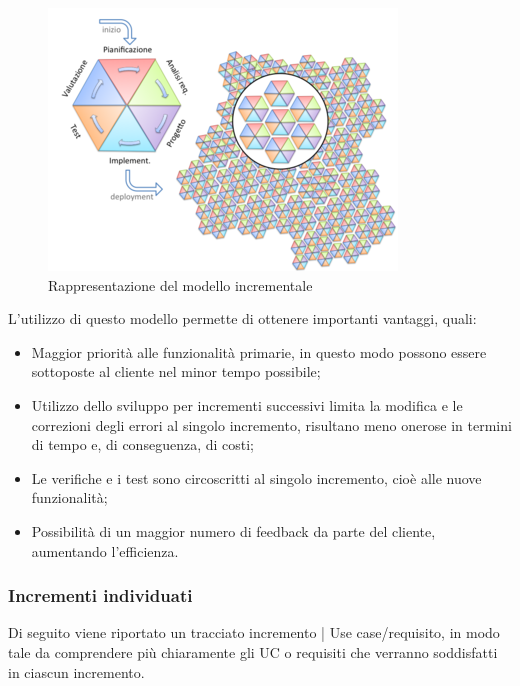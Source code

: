 \documentclass[../piano_di_progetto.tex]{subfiles}
\begin{document}
\begin{figure}[H]
    \centering
    \includegraphics[scale = 0.6]{src/img/modello_incrementale.png}
    \caption{Rappresentazione del modello incrementale}
    \label{fig:logo}
\end{figure}

L'utilizzo di questo modello permette di ottenere importanti vantaggi, quali:
\begin{itemize}
    \item Maggior priorità alle funzionalità primarie, in questo modo possono essere sottoposte al cliente nel minor tempo possibile;
    \item Utilizzo dello sviluppo per incrementi successivi limita la modifica e le correzioni degli errori al singolo incremento, risultano meno onerose in termini di tempo e, di conseguenza, di costi;
    \item Le verifiche e i test sono circoscritti al singolo incremento, cioè alle nuove funzionalità;
    \item Possibilità di un maggior numero di feedback da parte del cliente, aumentando l'efficienza.
\end{itemize}

\subsubsection{Incrementi individuati}
\label{ssub:incr_ind}

Di seguito viene riportato un tracciato incremento | Use case/requisito, in modo tale da comprendere più chiaramente gli UC o requisiti che verranno soddisfatti in ciascun incremento. 
\end{document}
